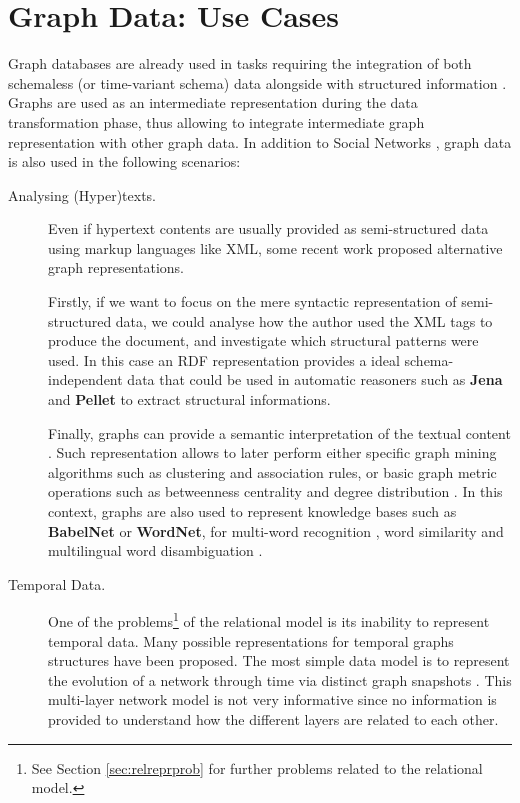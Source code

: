 \section{Graph Data: Use Cases}
Graph databases are already used in tasks requiring the  integration of both schemaless (or time-variant schema) data alongside  with structured information  \cite{Petermann2014,SoussiAZ11}. Graphs are used as an intermediate
representation during the data transformation phase, thus allowing to
integrate intermediate graph representation with other graph data.
In addition to Social Networks \cite{DMR}, graph data is also used in the following scenarios:

\begin{description}
	\item[Analysing (Hyper)texts.]
	Even if hypertext contents are usually provided as semi-structured data using markup languages like XML,
	some recent work  proposed alternative graph representations. 
	\medskip
	
	Firstly, if
	we want to focus on the mere syntactic representation of  semi-structured data, we could analyse how the
	author used the XML tags to produce the document, and investigate which structural patterns were used.
	In this case an RDF representation 
	\cite{Lassila1999,GutierrezInclusion}
	provides a ideal schema-independent data  \cite{IorioHierarchy,BarabucciEARMARK} that could be used in automatic reasoners such as \textbf{Jena} \cite{Jena} and \textbf{Pellet} \cite{Pellet} to extract
	structural informations.
	\medskip
	
	Finally, graphs can provide a semantic interpretation of the textual content
	 \cite{Iglesias}. Such representation allows to later
	perform either specific graph mining algorithms \cite{Samatova} such as clustering and association rules,
	or basic graph metric operations such as betweenness centrality and degree distribution \cite{Newman}.
	In this context, graphs are also used  to represent  knowledge bases
	such as \textbf{BabelNet} or \textbf{WordNet}, for
	multi-word recognition \cite{Lossio-Ventura2014}, word similarity \cite{SemSim} and multilingual
	word disambiguation \cite{MultiWordSense}.
	
	\item[Temporal Data.] One of the problems\footnote{See Section \vref{sec:relreprprob} for further problems related to the relational model.} of the relational model is its inability to represent temporal data. Many possible representations for temporal graphs structures have been proposed.
	The most simple data model is to represent the evolution of a network through time via distinct graph
	snapshots \cite{AnIntroductionGraph}. This multi-layer network model is
	not very informative since no information is provided to understand how the different layers are related to
	each other.
	

\end{description}
